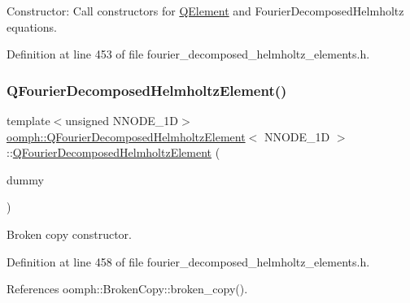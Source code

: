 Constructor\+: Call constructors for \hyperlink{classoomph_1_1QElement}{Q\+Element} and Fourier\+Decomposed\+Helmholtz equations. 



Definition at line 453 of file fourier\+\_\+decomposed\+\_\+helmholtz\+\_\+elements.\+h.

\mbox{\label{classoomph_1_1QFourierDecomposedHelmholtzElement_afd2e6b4d996cfb4f33ac91bcd5e603c3}} 
\subsubsection{\texorpdfstring{Q\+Fourier\+Decomposed\+Helmholtz\+Element()}{QFourierDecomposedHelmholtzElement()}\hspace{0.1cm}{\footnotesize\ttfamily [2/2]}}
{\footnotesize\ttfamily template$<$unsigned N\+N\+O\+D\+E\+\_\+1D$>$ \\
\hyperlink{classoomph_1_1QFourierDecomposedHelmholtzElement}{oomph\+::\+Q\+Fourier\+Decomposed\+Helmholtz\+Element}$<$ N\+N\+O\+D\+E\+\_\+1D $>$\+::\hyperlink{classoomph_1_1QFourierDecomposedHelmholtzElement}{Q\+Fourier\+Decomposed\+Helmholtz\+Element} (\begin{DoxyParamCaption}\item[{const \hyperlink{classoomph_1_1QFourierDecomposedHelmholtzElement}{Q\+Fourier\+Decomposed\+Helmholtz\+Element}$<$ N\+N\+O\+D\+E\+\_\+1D $>$ \&}]{dummy }\end{DoxyParamCaption})\hspace{0.3cm}{\ttfamily [inline]}}



Broken copy constructor. 



Definition at line 458 of file fourier\+\_\+decomposed\+\_\+helmholtz\+\_\+elements.\+h.



References oomph\+::\+Broken\+Copy\+::broken\+\_\+copy().



